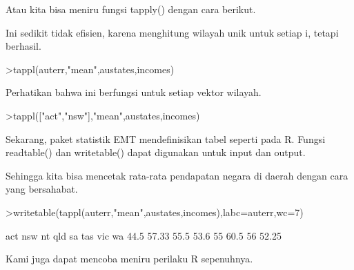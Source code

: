 \documentclass[a4paper,10pt]{article}
\begin{document}
\begin{eulernotebook}
\begin{eulercomment}
\begin{eulercomment}
\begin{eulercomment}
\begin{eulercomment}
\begin{eulercomment}
\begin{eulercomment}
\begin{eulercomment}
\begin{eulercomment}
\begin{eulercomment}
\begin{eulercomment}
\begin{eulercomment}
\begin{eulercomment}
\begin{eulercomment}
\begin{eulercomment}
\begin{eulercomment}
\begin{eulercomment}
\begin{eulercomment}
\begin{eulercomment}
\begin{eulercomment}
Atau kita bisa meniru fungsi tapply() dengan cara berikut.
\end{eulercomment}
\begin{eulercomment}
Ini sedikit tidak efisien, karena menghitung wilayah unik untuk setiap
i, tetapi berhasil.
\end{eulercomment}
\begin{eulerprompt}
>tappl(auterr,"mean",austates,incomes)
\end{eulerprompt}
\begin{euleroutput}
  [44.5,  57.3333333333,  55.5,  53.6,  55,  60.5,  56,  52.25]
\end{euleroutput}
\begin{eulercomment}
Perhatikan bahwa ini berfungsi untuk setiap vektor wilayah.
\end{eulercomment}
\begin{eulerprompt}
>tappl(["act","nsw"],"mean",austates,incomes)
\end{eulerprompt}
\begin{euleroutput}
  [44.5,  57.3333333333]
\end{euleroutput}
\begin{eulercomment}
Sekarang, paket statistik EMT mendefinisikan tabel seperti pada R.
Fungsi readtable() dan writetable() dapat digunakan untuk input dan
output.

Sehingga kita bisa mencetak rata-rata pendapatan negara di daerah
dengan cara yang bersahabat.
\end{eulercomment}
\begin{eulerprompt}
>writetable(tappl(auterr,"mean",austates,incomes),labc=auterr,wc=7)
\end{eulerprompt}
\begin{euleroutput}
      act    nsw     nt    qld     sa    tas    vic     wa
     44.5  57.33   55.5   53.6     55   60.5     56  52.25
\end{euleroutput}
\begin{eulercomment}
Kami juga dapat mencoba meniru perilaku R sepenuhnya.


\end{eulercomment}
\end{eulercomment}
\end{eulercomment}
\end{eulercomment}
\end{eulercomment}
\end{eulercomment}
\end{eulercomment}
\end{eulercomment}
\end{eulercomment}
\end{eulercomment}
\end{eulercomment}
\end{eulercomment}
\end{eulercomment}
\end{eulercomment}
\end{eulercomment}
\end{eulercomment}
\end{eulercomment}
\end{eulercomment}
\end{eulercomment}
\end{eulernotebook}
\end{document}
